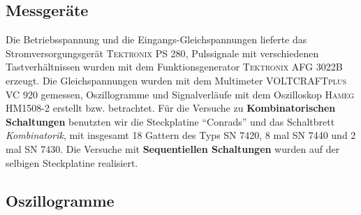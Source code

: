 \documentclass[numbers=noenddot,12pt,a4paper]{scrartcl}
\begin{document}
\subsection{Messgeräte}
Die Betriebsspannung und die Eingangs-Gleichspannungen lieferte das Stromversorgungsgerät \textsc{Tektronix PS 280}, Pulssignale mit verschiedenen Tastverhältnissen wurden mit dem Funktionsgenerator \textsc{Tektronix AFG 3022B} erzeugt. Die Gleichspannungen wurden mit dem Multimeter \textsc{VOLTCRAFTplus VC 920} gemessen, Oszillogramme und Signalverläufe mit dem Oszilloskop \textsc{Hameg HM1508-2} erstellt bzw. betrachtet. Für die Versuche zu \textbf{Kombinatorischen Schaltungen} benutzten wir die Steckplatine "`Conrads"' und das Schaltbrett \textit{Kombinatorik}, mit insgesamt 18 Gattern des Typs SN 7420, 8 mal SN 7440 und 2 mal SN 7430. Die Versuche mit \textbf{Sequentiellen Schaltungen} wurden auf der selbigen Steckplatine realisiert.
\subsection{Oszillogramme}
\end{document}
